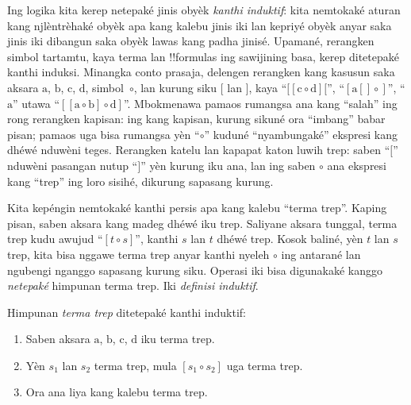 \documentclass[../../../include/open-logic-section]{subfiles}
\begin{document}


Ing logika kita kerep netepaké jinis
obyèk \emph{kanthi induktif}: kita nemtokaké
aturan kang njlèntrèhaké obyèk apa kang
kalebu jinis iki lan kepriyé obyèk anyar
saka jinis iki dibangun saka obyèk lawas
kang padha jinisé. Upamané, rerangken
simbol tartamtu, kaya terma lan !!{formula}s
ing sawijining basa, kerep ditetepaké
kanthi induksi. Minangka conto prasaja,
delengen rerangken kang kasusun saka aksara
$\mathrm{a}$, $\mathrm{b}$, $\mathrm{c}$,
$\mathrm{d}$, simbol~$\circ$, lan kurung
siku $[$ lan $]$, kaya
``$[[\mathrm{c} \circ \mathrm{d}][$'',
``$[\mathrm{a}[]\circ]$'',
``$\mathrm{a}$'' utawa
``$[[\mathrm{a} \circ \mathrm{b}]\circ
\mathrm{d}]$''. Mbokmenawa pamaos
rumangsa ana kang ``salah'' ing rong
rerangken kapisan: ing kang kapisan,
kurung sikuné ora ``imbang'' babar pisan;
pamaos uga bisa rumangsa yèn
``$\circ$'' kuduné ``nyambungaké''
ekspresi kang dhéwé nduwèni teges.
Rerangken katelu lan kapapat katon
luwih trep: saben ``$[$'' nduwèni
pasangan nutup ``$]$'' yèn kurung
iku ana, lan ing saben $\circ$
ana ekspresi kang ``trep'' ing
loro sisihé, dikurung sapasang kurung.

Kita kepéngin nemtokaké kanthi persis
apa kang kalebu ``terma trep''.
Kaping pisan, saben aksara kang madeg
dhéwé iku trep. Saliyane aksara tunggal,
terma trep kudu awujud ``$[t \circ s]$'',
kanthi $s$ lan $t$ dhéwé trep.
Kosok baliné, yèn $t$ lan $s$
trep, kita bisa nggawe terma trep
anyar kanthi nyeleh $\circ$
ing antarané lan ngubengi nganggo
sapasang kurung siku. Operasi iki
bisa digunakaké kanggo
\emph{netepaké} himpunan
terma trep. Iki \emph{definisi
  induktif}.

\begin{defn}
  Himpunan \emph{terma trep}
  ditetepaké kanthi induktif:
  \begin{enumerate}
  \item Saben aksara $\mathrm{a}$,
    $\mathrm{b}$, $\mathrm{c}$,
    $\mathrm{d}$ iku terma trep.
  \item Yèn $s_1$ lan $s_2$
    terma trep, mula $[s_1 \circ s_2]$
    uga terma trep.
  \item Ora ana liya kang kalebu
    terma trep.
  \end{enumerate}
\end{defn}
\end{document}

